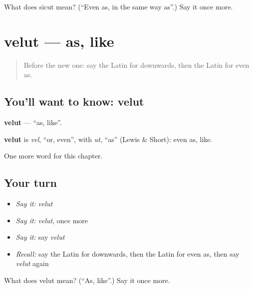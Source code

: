 \begin{tcolorbox}[breakable,colback=teal!4,colframe=teal!35!black,title={Before you move on}]
What does sīcut mean? (\textquotedblleft{}Even as, in the same way as\textquotedblright{}.) Say it once more.
\end{tcolorbox}
\section[velut]{velut — as, like}

\label{lesson:LA-C265-velut}



\begin{quote}
Before the new one: say the Latin for downwards, then the Latin for even as.
\end{quote}

\subsection*{You'll want to know: velut}
\textbf{velut} — \textquotedblleft{}as, like\textquotedblright{}.

\begin{cousinweb}
\textbf{velut} is \emph{vel}, \textquotedblleft{}or, even\textquotedblright{}, with \emph{ut}, \textquotedblleft{}as\textquotedblright{} (Lewis \& Short): even as, like.
\end{cousinweb}

\begin{grammarlens}[title={What you've built}]
One more word for this chapter.
\end{grammarlens}

\subsection*{Your turn}
\begin{itemize}
\raggedright
  \item \emph{Say it:} \emph{velut}
  \item \emph{Say it:} \emph{velut}, once more
  \item \emph{Say it:} say \emph{velut}
  \item \emph{Recall:} say the Latin for downwards, then the Latin for even as, then say \emph{velut} again
\end{itemize}

\begin{tcolorbox}[breakable,colback=teal!4,colframe=teal!35!black,title={Before you move on}]
What does velut mean? (\textquotedblleft{}As, like\textquotedblright{}.) Say it once more.
\end{tcolorbox}
